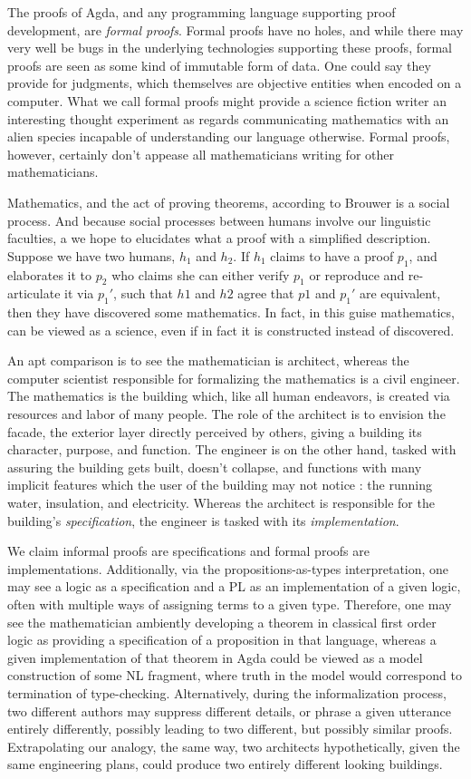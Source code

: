 The proofs of Agda, and any programming language supporting proof development,
are \emph{formal proofs}. Formal proofs have no holes, and while there may very
well be bugs in the underlying technologies supporting these proofs, formal
proofs are seen as some kind of immutable form of data. One could say they
provide \cite{objective evidence} for judgments, which themselves are objective
entities when encoded on a computer. What we call
formal proofs might provide a science fiction writer an interesting thought
experiment as regards communicating mathematics with an alien species incapable
of understanding our language otherwise. Formal proofs, however, certainly don't appease all
mathematicians writing for other mathematicians.

Mathematics, and the act of proving theorems, according to Brouwer is a social
process. And because social processes between humans involve our linguistic
faculties, a we hope to elucidates what a proof with a simplified description.
Suppose we have two humans, $h_1$ and $h_2$. If $h_1$ claims to have a proof
$p_1$, and elaborates it to $p_2$ who claims she can either verify $p_1$ or
reproduce and re-articulate it via $p_1'$, such that $h1$ and $h2$ agree that
$p1$ and $p_1'$ are equivalent, then they have discovered some mathematics. In
fact, in this guise mathematics, can be viewed as a science, even if in fact it
is constructed instead of discovered.

An apt comparison is to see the mathematician is architect, whereas the computer
scientist responsible for formalizing the mathematics is a civil engineer. The
mathematics is the building which, like all human endeavors, is created via
resources and labor of many people. The role of the architect is to envision the
facade, the exterior layer directly perceived by others, giving a building its
character, purpose, and function. The engineer is on the other hand, tasked with
assuring the building gets built, doesn't collapse, and functions with many
implicit features which the user of the building may not notice : the running
water, insulation, and electricity. Whereas the architect is responsible for the
building's \emph{specification}, the engineer is tasked with its
\emph{implementation}.

We claim informal proofs are specifications and formal proofs are implementations.
Additionally, via the propositions-as-types interpretation, one may see a logic
as a specification and a PL as an implementation of a given logic, 
often with multiple ways of assigning terms to a given type. Therefore, one may
see the mathematician ambiently developing a theorem in classical first order
logic as providing a specification of a proposition in that language, whereas a given
implementation of that theorem in Agda could be viewed as a model construction
of some NL fragment, where truth in the model would correspond to termination of
type-checking. Alternatively, during the informalization process, two different
authors may suppress different details, or phrase a given utterance entirely
differently, possibly leading to two different, but possibly similar proofs.
Extrapolating our analogy,
the same way, two architects hypothetically, given the same engineering plans,
could produce two entirely different looking buildings.

